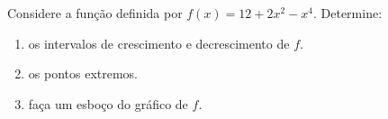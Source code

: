 \begin{frame}{}
    \begin{example}
        Considere a função definida por $f(x)=12 + 2x^2 - x^4$. Determine:
        \begin{enumerate}[a]
            \item<only@+> os intervalos de crescimento e decrescimento de $f$.
            \item<only@+> os pontos extremos.
            \item<only@+> faça um esboço do gráfico de $f$.
        \end{enumerate}
    \end{example}
\end{frame}